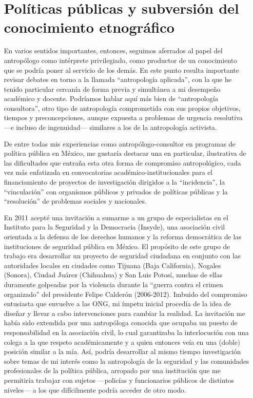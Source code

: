 \documentclass[
  spanish,
  11pt,
  a4paper,
]{scrbook}
\begin{document}
\section*{Políticas públicas y subversión del conocimiento
etnográfico}\label{poluxedticas-puxfablicas-y-subversiuxf3n-del-conocimiento-etnogruxe1fico}


En varios sentidos importantes, entonces, seguimos aferrados al papel
del antropólogo como intérprete privilegiado, como productor de un
conocimiento que se podría poner al servicio de los demás. En este punto
resulta importante revisar debates en torno a la llamada ``antropología
aplicada'', con la que he tenido particular cercanía de forma previa y
simultánea a mi desempeño académico y docente. Podríamos hablar aquí más
bien de ``antropología consultora'', otro tipo de antropología
comprometida con sus propios objetivos, tiempos y preconcepciones,
aunque expuesta a problemas de urgencia resolutiva ---e incluso de
ingenuidad--- similares a los de la antropología activista.

De entre todas mis experiencias como antropólogo-consultor en programas
de política pública en México, me gustaría destacar una en particular,
ilustrativa de las dificultades que entraña esta otra forma de
compromiso antropológico, cada vez más enfatizada en convocatorias
académico-institucionales para el financiamiento de proyectos de
investigación dirigidos a la ``incidencia'', la ``vinculación'' con
organismos públicos y privados de políticas públicas y la ``resolución''
de problemas sociales y nacionales.

En 2011 acepté una invitación a sumarme a un grupo de especialistas en
el Instituto para la Seguridad y la Democracia (Insyde), una asociación
civil orientada a la defensa de los derechos humanos y la reforma
democrática de las instituciones de seguridad pública en México. El
propósito de este grupo de trabajo era desarrollar un proyecto de
seguridad ciudadana en conjunto con las autoridades locales en ciudades
como Tijuana (Baja California), Nogales (Sonora), Ciudad Juárez
(Chihuahua) y San Luis Potosí, muchas de ellas duramente golpeadas por
la violencia durante la ``guerra contra el crimen organizado'' del
presidente Felipe Calderón (2006-2012). Imbuido del compromiso
entusiasta que envuelve a las ONG, mi ímpetu inicial procedía de la idea
de diseñar y llevar a cabo intervenciones para cambiar la realidad. La
invitación me había sido extendida por una antropóloga conocida que
ocupaba un puesto de responsabilidad en la asociación civil, lo cual
garantizaba la interlocución con una colega a la que respeto
académicamente y a quien entonces veía en una (doble) posición similar a
la mía. Así, podría desarrollar al mismo tiempo investigación sobre
temas de mi interés como la antropología de la seguridad y las
comunidades profesionales de la política pública, arropado por una
institución que me permitiría trabajar con sujetos ---policías y
funcionarios públicos de distintos niveles--- a los que difícilmente
podría acceder de otro modo.
\end{document}
